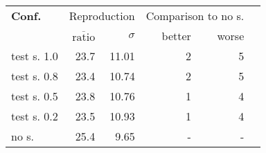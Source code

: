 \begin{tabular}{ l r r | r r r }
  \hline 
  \textbf{Conf.} & \multicolumn{2}{c|}{Reproduction} & \multicolumn{2}{c}{Comparison to no s.} \\ 
    & $\overline{\text{ratio}}$ & $\sigma$ & better & worse \\ 
  \hline 
  test s. 1.0 & 23.7 & 11.01 & 2 & 5 \\ 
  test s. 0.8 & 23.4 & 10.74 & 2 & 5 \\ 
  test s. 0.5 & 23.8 & 10.76 & 1 & 4 \\ 
  test s. 0.2 & 23.5 & 10.93 & 1 & 4 \\ 
  no s. & 25.4 & 9.65 & - & - \\ 
  \hline 
  \end{tabular}